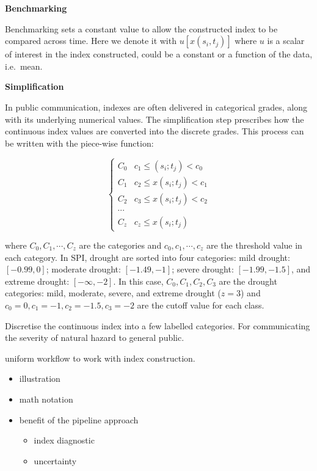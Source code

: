\documentclass[
  letterpaper,
  DIV=11,
  numbers=noendperiod]{scrartcl}
\providecommand{\tightlist}{%
  \setlength{\itemsep}{0pt}\setlength{\parskip}{0pt}}\usepackage{longtable,booktabs,array}
\begin{document}
\textbf{Benchmarking}

Benchmarking sets a constant value to allow the constructed index to be
compared across time. Here we denote it with \(u[x(s_i, t_j)]\) where
\(u\) is a scalar of interest in the index constructed, could be a
constant or a function of the data, i.e.~mean.

\textbf{Simplification}

In public communication, indexes are often delivered in categorical
grades, along with its underlying numerical values. The simplification
step prescribes how the continuous index values are converted into the
discrete grades. This process can be written with the piece-wise
function:

\[
\begin{cases}
C_0 & c_1 \leq (s_i; t_j) < c_0 \\
C_1 & c_2 \leq x(s_i; t_j) < c_1 \\
C_2 & c_3 \leq x(s_i; t_j) < c_2 \\
\cdots \\
C_z & c_z \leq x(s_i; t_j)
\end{cases}
\]

where \(C_0, C_1,\cdots ,C_z\) are the categories and
\(c_0, c_1, \cdots, c_z\) are the threshold value in each category. In
SPI, drought are sorted into four categories: mild drought:
\([-0.99, 0]\); moderate drought: \([-1.49, -1]\); severe drought:
\([-1.99, -1.5]\), and extreme drought: \([-\infty, -2]\). In this case,
\(C_0, C_1, C_2, C_3\) are the drought categories: mild, moderate,
severe, and extreme drought (\(z = 3\)) and
\(c_0 =0, c_1 = -1, c_2 = -1.5, c_3 = -2\) are the cutoff value for each
class.

Discretise the continuous index into a few labelled categories. For
communicating the severity of natural hazard to general public.

uniform workflow to work with index construction.

\begin{itemize}
\tightlist
\item
  illustration
\item
  math notation
\item
  benefit of the pipeline approach

  \begin{itemize}
  \tightlist
  \item
    index diagnostic
  \item
    uncertainty
  \end{itemize}
\end{itemize}
\end{document}

